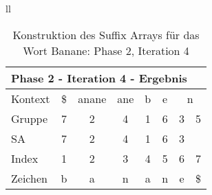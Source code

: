 \begin{table}[H]
\begin{adjustbox}{max width=\textwidth}
\begin{tabular}{ll}
\begin{tabular}{lccccccc}
\multicolumn{8}{l}{Phase 2 - Iteration 4 - Ergebnis}                                                                                                                                     \\ \hline
\multicolumn{1}{l|}{Kontext} & \multicolumn{1}{c|}{\$} & \multicolumn{1}{c|}{anane} & \multicolumn{1}{c|}{ane} & \multicolumn{1}{c|}{b} & \multicolumn{1}{c|}{e} & \multicolumn{2}{c}{n} \\
\multicolumn{1}{l|}{Gruppe}  & \multicolumn{1}{c|}{7}  & \multicolumn{1}{c|}{2}     & \multicolumn{1}{c|}{4}   & \multicolumn{1}{c|}{1} & \multicolumn{1}{c|}{6} & 3         & 5          \\ 
\multicolumn{1}{l|}{SA}      & \multicolumn{1}{c|}{7}  & \multicolumn{1}{c|}{2}     & \multicolumn{1}{c|}{4}   & \multicolumn{1}{c|}{1} & \multicolumn{1}{c|}{6} & 3         &            \\ \hline
\multicolumn{1}{l|}{Index}   & 1                       & 2                          & 3                        & 4                      & 5                      & 6         & 7          \\
\multicolumn{1}{l|}{Zeichen} & b                       & a                          & n                        & a                      & n                      & e         & \$        
\end{tabular}

\end{tabular}
\end{adjustbox}

\caption[Konstruktion des Suffix Arrays für das Wort Banane: Phase 2, Iteration 4]{Konstruktion des Suffix Arrays für das Wort Banane: Phase 2, Iteration 4}
\label{fig_banane_2_4} 
\end{table}
